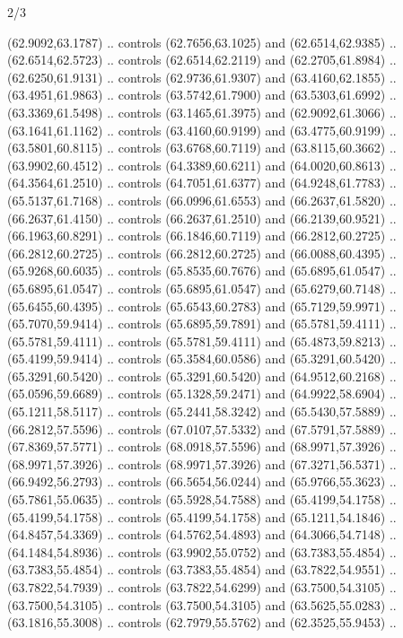 \begin{flagdescription}{2/3}
\begin{scope}[xshift=0.3333\flaglength,yshift=0.5\flagwidth,scale=\flagwidth/711.3]
\begin{scope}
    (62.9092,63.1787) .. controls (62.7656,63.1025) and (62.6514,62.9385) ..
    (62.6514,62.5723) .. controls (62.6514,62.2119) and (62.2705,61.8984) ..
    (62.6250,61.9131) .. controls (62.9736,61.9307) and (63.4160,62.1855) ..
    (63.4951,61.9863) .. controls (63.5742,61.7900) and (63.5303,61.6992) ..
    (63.3369,61.5498) .. controls (63.1465,61.3975) and (62.9092,61.3066) ..
    (63.1641,61.1162) .. controls (63.4160,60.9199) and (63.4775,60.9199) ..
    (63.5801,60.8115) .. controls (63.6768,60.7119) and (63.8115,60.3662) ..
    (63.9902,60.4512) .. controls (64.3389,60.6211) and (64.0020,60.8613) ..
    (64.3564,61.2510) .. controls (64.7051,61.6377) and (64.9248,61.7783) ..
    (65.5137,61.7168) .. controls (66.0996,61.6553) and (66.2637,61.5820) ..
    (66.2637,61.4150) .. controls (66.2637,61.2510) and (66.2139,60.9521) ..
    (66.1963,60.8291) .. controls (66.1846,60.7119) and (66.2812,60.2725) ..
    (66.2812,60.2725) .. controls (66.2812,60.2725) and (66.0088,60.4395) ..
    (65.9268,60.6035) .. controls (65.8535,60.7676) and (65.6895,61.0547) ..
    (65.6895,61.0547) .. controls (65.6895,61.0547) and (65.6279,60.7148) ..
    (65.6455,60.4395) .. controls (65.6543,60.2783) and (65.7129,59.9971) ..
    (65.7070,59.9414) .. controls (65.6895,59.7891) and (65.5781,59.4111) ..
    (65.5781,59.4111) .. controls (65.5781,59.4111) and (65.4873,59.8213) ..
    (65.4199,59.9414) .. controls (65.3584,60.0586) and (65.3291,60.5420) ..
    (65.3291,60.5420) .. controls (65.3291,60.5420) and (64.9512,60.2168) ..
    (65.0596,59.6689) .. controls (65.1328,59.2471) and (64.9922,58.6904) ..
    (65.1211,58.5117) .. controls (65.2441,58.3242) and (65.5430,57.5889) ..
    (66.2812,57.5596) .. controls (67.0107,57.5332) and (67.5791,57.5889) ..
    (67.8369,57.5771) .. controls (68.0918,57.5596) and (68.9971,57.3926) ..
    (68.9971,57.3926) .. controls (68.9971,57.3926) and (67.3271,56.5371) ..
    (66.9492,56.2793) .. controls (66.5654,56.0244) and (65.9766,55.3623) ..
    (65.7861,55.0635) .. controls (65.5928,54.7588) and (65.4199,54.1758) ..
    (65.4199,54.1758) .. controls (65.4199,54.1758) and (65.1211,54.1846) ..
    (64.8457,54.3369) .. controls (64.5762,54.4893) and (64.3066,54.7148) ..
    (64.1484,54.8936) .. controls (63.9902,55.0752) and (63.7383,55.4854) ..
    (63.7383,55.4854) .. controls (63.7383,55.4854) and (63.7822,54.9551) ..
    (63.7822,54.7939) .. controls (63.7822,54.6299) and (63.7500,54.3105) ..
    (63.7500,54.3105) .. controls (63.7500,54.3105) and (63.5625,55.0283) ..
    (63.1816,55.3008) .. controls (62.7979,55.5762) and (62.3525,55.9453) ..

\end{scope}
\end{scope}
\end{flagdescription}
